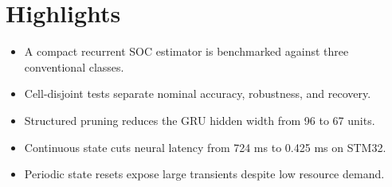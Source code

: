\documentclass[11pt,a4paper]{article}
\begin{document}
\section*{Highlights}

\begin{itemize}
  \item A compact recurrent SOC estimator is benchmarked against three conventional classes.
  \item Cell-disjoint tests separate nominal accuracy, robustness, and recovery.
  \item Structured pruning reduces the GRU hidden width from 96 to 67 units.
  \item Continuous state cuts neural latency from 724 ms to 0.425 ms on STM32.
  \item Periodic state resets expose large transients despite low resource demand.
\end{itemize}
\end{document}
